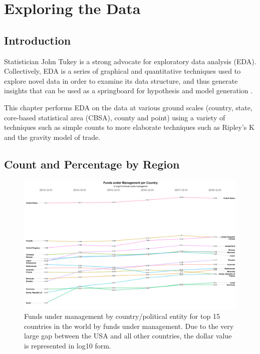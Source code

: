 \chapter{Exploring the Data}
\label{ChapterIIIb}
\section{Introduction}

Statistician John Tukey is a strong advocate for exploratory data analysis (EDA).  Collectively, EDA is a series of graphical and quantitative techniques used to explore novel data in order to examine its data structure, and thus generate insights that can be used as a springboard for hypothesis and model generation \citep{tukey77,Hoaglin1982}.  

This chapter performs EDA on the data at various ground scales (country, state, core-based statistical area (CBSA), county and point) using a variety of techniques such as simple counts to more elaborate techniques such as Ripley's K and the gravity model of trade. 

\section{Count and Percentage by Region}
\begin{figure}[h]
	\centering
	\includegraphics[width=1\linewidth]{Figures/ChapterIII/Funds_Per_Country_Slopegraph}
	\caption[Funds Under Management per Country in Log10]{Funds under management by country/political entity for top 15 countries in the world by funds under management.  Due to the very large gap between the USA and all other countries, the dollar value is represented in log10 form.}
	\label{fig:fundspercountryslopegraph}
\end{figure}


